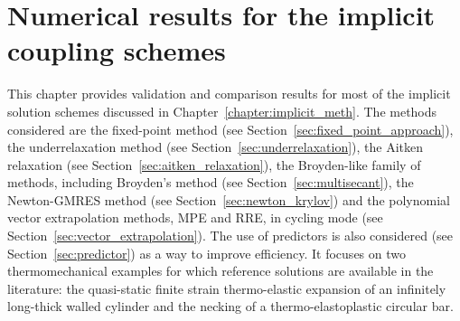 \chapter{Numerical results for the implicit coupling schemes}

This chapter provides validation and comparison results for most of the implicit solution schemes discussed in Chapter~\ref{chapter:implicit_meth}.
The methods considered are the fixed-point method (see Section~\ref{sec:fixed_point_approach}), the underrelaxation method (see Section~\ref{sec:underrelaxation}), the Aitken relaxation (see Section~\ref{sec:aitken_relaxation}), the Broyden-like family of methods, including Broyden's method (see Section~\ref{sec:multisecant}), the Newton-GMRES method (see Section~\ref{sec:newton_krylov}) and the polynomial vector extrapolation methods, MPE and RRE, in cycling mode (see Section~\ref{sec:vector_extrapolation}).
The use of predictors is also considered (see Section~\ref{sec:predictor}) as a way to improve efficiency.
It focuses on two thermomechanical examples for which reference solutions are available in the literature: the quasi-static finite strain thermo-elastic expansion of an infinitely long-thick walled cylinder and the necking of a thermo-elastoplastic circular bar.

